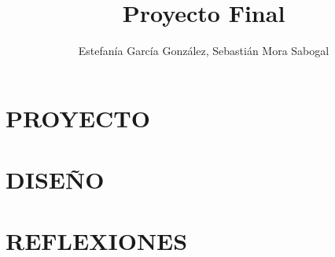 \documentclass[11pt,letterpaper]{book}
\title{Proyecto Final}
\author{Estefanía García González, Sebastián Mora Sabogal}
\begin{document}
\maketitle
\tableofcontents
\listoffigures

\part{PROYECTO}


\part{DISEÑO}








\part{REFLEXIONES}



\end{document}
